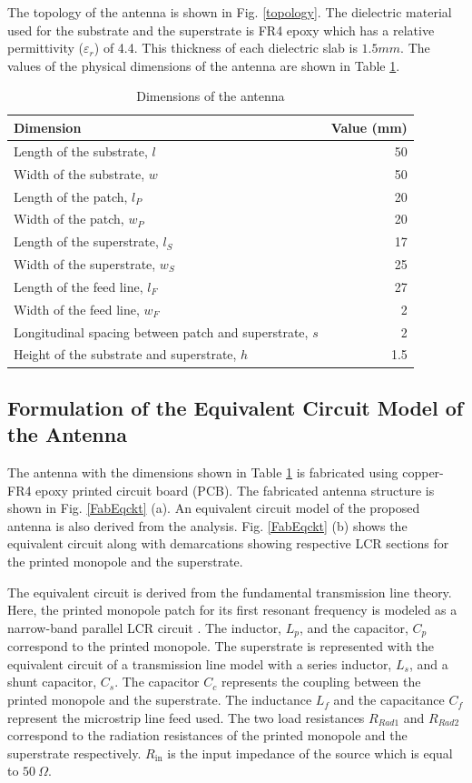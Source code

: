 The topology of the antenna is shown in Fig. \ref{topology}. The dielectric material used for the substrate and the superstrate is FR4 epoxy which has a relative permittivity ($\varepsilon_r$) of 4.4. This thickness of each dielectric slab is $1.5mm$. The values of the physical dimensions of the antenna are shown in Table \ref{table-dims}.
\begin{table}
\centering
\caption{Dimensions of the antenna} \label{table-dims}
\begin{tabular}{|l|r|}
\hline
\textbf{Dimension} & \textbf{Value (mm)} \\ \hline
Length of the substrate, $l$ & 50 \\ \hline
Width of the substrate, $w$ & 50 \\ \hline
Length of the patch, $l_P$ & 20 \\ \hline
Width of the patch, $w_P$ & 20 \\ \hline
Length of the superstrate, $l_S$ & 17 \\ \hline
Width of the superstrate, $w_S$ & 25 \\ \hline
Length of the feed line, $l_F$ & 27 \\ \hline
Width of the feed line, $w_F$ & 2 \\ \hline
Longitudinal spacing between patch and superstrate, $s$ & 2 \\ \hline
Height of the substrate and superstrate, $h$ & 1.5 \\ \hline
\end{tabular}
\end{table}

\subsection{Formulation of the Equivalent Circuit Model of the Antenna}
The antenna with the dimensions shown in Table \ref{table-dims} is fabricated using copper-FR4 epoxy printed circuit board (PCB). The fabricated antenna structure is shown in Fig. \ref{FabEqckt} (a). An equivalent circuit model of the proposed antenna is also derived from the analysis. Fig. \ref{FabEqckt} (b) shows the equivalent circuit along with demarcations showing respective LCR sections for the printed monopole and the superstrate.

The equivalent circuit is derived from the fundamental transmission line theory. Here, the printed monopole patch for its first resonant frequency is modeled as a narrow-band parallel LCR circuit \cite{UwbPmaEqCkt1}. The inductor, $L_p$, and the capacitor, $C_p$ correspond to the printed monopole. The superstrate is represented with the equivalent circuit of a transmission line model with a series inductor, $L_s$, and a shunt capacitor, $C_s$. The capacitor $C_c$ represents the coupling between the printed monopole and the superstrate. The inductance $L_{f}$ and the capacitance $C_{f}$ represent the microstrip line feed used. The two load resistances $R_{Rad1}$ and $R_{Rad2}$ correspond to the radiation resistances of the printed monopole and the superstrate respectively. $R_{\text{in}}$ is the input impedance of the source which is equal to $50~\Omega$.

